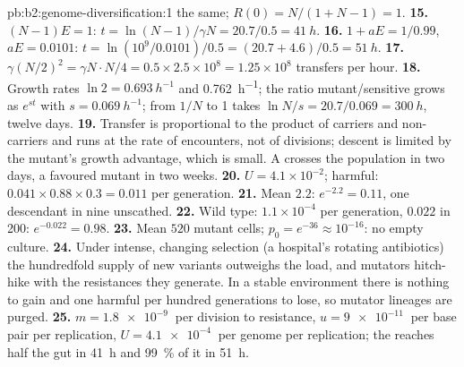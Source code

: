 \begin{solution}{pb:b2:genome-diversification:1}
the same; $R(0) = N/(1 + N - 1) = 1$.
\textbf{15.} $(N - 1)E = 1$: $t = \ln(N - 1)/\gamma N = 20.7/0.5 =
\qty{41}{h}$.
\textbf{16.} $1 + aE = 1/0.99$, $aE = 0.0101$: $t = \ln(10^{9}/0.0101)
/0.5 = (20.7 + 4.6)/0.5 = \qty{51}{h}$.
\textbf{17.} $\gamma (N/2)^2 = \gamma N\cdot N/4 = 0.5\times 2.5\times
10^{8} = 1.25\times 10^{8}$ transfers per hour.
\textbf{18.} Growth rates $\ln 2 = \qty{0.693}{h^{-1}}$ and
\qty{0.762}{h^{-1}}; the ratio mutant/sensitive grows as $e^{st}$
with $s = \qty{0.069}{h^{-1}}$; from $1/N$ to 1 takes $\ln N/s =
20.7/0.069 = \qty{300}{h}$, twelve days.
\textbf{19.} Transfer is proportional to the product of carriers and
non-carriers and runs at the rate of encounters, not of divisions;
descent is limited by the mutant's growth advantage, which is small.
A  crosses the population in two days, a favoured mutant in
two weeks.
\textbf{20.} $U = 4.1\times 10^{-2}$; harmful: $0.041\times 0.88\times
0.3 = 0.011$ per generation.
\textbf{21.} Mean $2.2$: $e^{-2.2} = 0.11$, one descendant in nine
unscathed.
\textbf{22.} Wild type: $1.1\times 10^{-4}$ per generation, $0.022$ in
200: $e^{-0.022} = 0.98$.
\textbf{23.} Mean $520$ mutant cells; $p_0 = e^{-36} \approx
10^{-16}$: no empty culture.
\textbf{24.} Under intense, changing selection (a hospital's rotating
antibiotics) the hundredfold supply of new variants outweighs the
load, and mutators hitch-hike with the resistances they generate. In
a stable environment there is nothing to gain and one harmful
 per hundred generations to lose, so mutator lineages are
purged.
\textbf{25.} $m = \qty{1.8e-9}{}$ per division to resistance, $u =
\qty{9e-11}{}$ per base pair per replication, $U = \qty{4.1e-4}{}$
 per genome per replication; the  reaches half the
gut in \qty{41}{h} and \qty{99}{\%} of it in \qty{51}{h}.
\end{solution}
